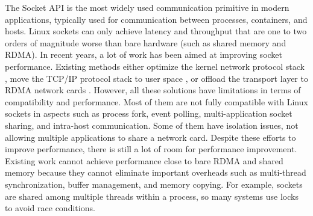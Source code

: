 
The Socket API is the most widely used communication primitive in modern applications, typically used for communication between processes, containers, and hosts. 
Linux sockets can only achieve latency and throughput that are one to two orders of magnitude worse than bare hardware (such as shared memory and RDMA).
In recent years, a lot of work has been aimed at improving socket performance. 
Existing methods either optimize the kernel network protocol stack \cite {lin2016scalable,han2012megapipe,yasukata2016stackmap}, move the TCP/IP protocol stack to user space \cite {jeong2014mtcp,marinos2014network,seastar,fstack,libvma}, or offload the transport layer to RDMA network cards \cite{rsockets,socketsdirect}.
However, all these solutions have limitations in terms of compatibility and performance. 
Most of them are not fully compatible with Linux sockets in aspects such as process fork, event polling, multi-application socket sharing, and intra-host communication. 
Some of them \cite {jeong2014mtcp} have isolation issues, not allowing multiple applications to share a network card. 
Despite these efforts to improve performance, there is still a lot of room for performance improvement. Existing work cannot achieve performance close to bare RDMA and shared memory because they cannot eliminate important overheads such as multi-thread synchronization, buffer management, and memory copying. 
For example, sockets are shared among multiple threads within a process, so many systems use locks to avoid race conditions.

